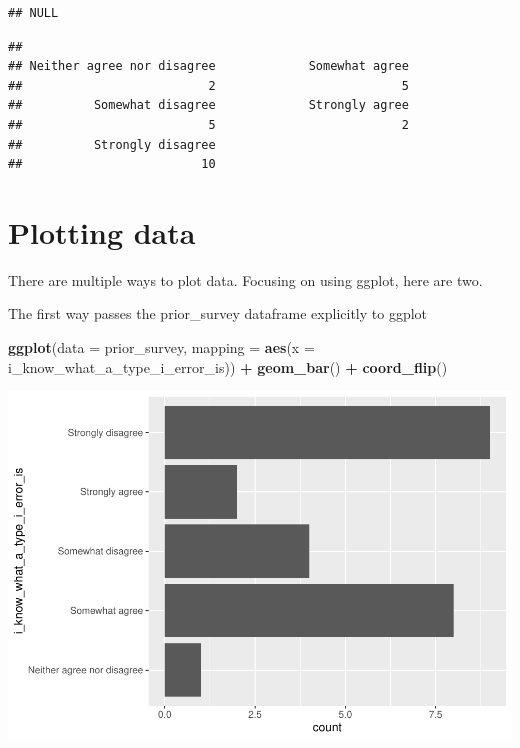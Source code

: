 \documentclass[
]{book}
\newenvironment{Shaded}{\begin{snugshade}}{\end{snugshade}}
\newcommand{\DataTypeTok}[1]{\textcolor[rgb]{0.13,0.29,0.53}{#1}}
\newcommand{\KeywordTok}[1]{\textcolor[rgb]{0.13,0.29,0.53}{\textbf{#1}}}
\newcommand{\NormalTok}[1]{#1}
\newcommand{\OperatorTok}[1]{\textcolor[rgb]{0.81,0.36,0.00}{\textbf{#1}}}
\newcommand{\StringTok}[1]{\textcolor[rgb]{0.31,0.60,0.02}{#1}}
\begin{document}
\begin{verbatim}
## NULL
\end{verbatim}

\begin{Shaded}
\end{Shaded}

\begin{verbatim}
## 
## Neither agree nor disagree             Somewhat agree 
##                          2                          5 
##          Somewhat disagree             Strongly agree 
##                          5                          2 
##          Strongly disagree 
##                         10
\end{verbatim}

\hypertarget{plotting-data}{%
\section{Plotting data}\label{plotting-data}}

There are multiple ways to plot data. Focusing on using ggplot, here are two.

The first way passes the prior\_survey dataframe explicitly to ggplot

\begin{Shaded}
\begin{Highlighting}[]
\KeywordTok{ggplot}\NormalTok{(}\DataTypeTok{data =}\NormalTok{ prior\_survey, }\DataTypeTok{mapping =} \KeywordTok{aes}\NormalTok{(}\DataTypeTok{x =}\NormalTok{ i\_know\_what\_a\_type\_i\_error\_is)) }\OperatorTok{+}
\StringTok{  }\KeywordTok{geom\_bar}\NormalTok{() }\OperatorTok{+}
\StringTok{  }\KeywordTok{coord\_flip}\NormalTok{()}
\end{Highlighting}
\end{Shaded}

\includegraphics{test_course_notes_files/figure-latex/unnamed-chunk-9-1.pdf}
\end{document}
